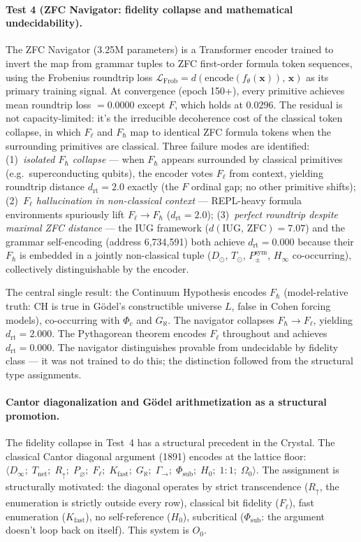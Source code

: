 \documentclass[12pt,a4paper]{article}
\newcommand{\Phic}{\Phi_c}
\newcommand{\Ppms}{P_{\pm}^{\text{sym}}}
\newcommand{\GamSeq}{\Gamma_{\to}}
\begin{document}
\paragraph{Test 4 (ZFC Navigator: fidelity collapse and mathematical
undecidability).}
\label{par:zfc_nav}
The ZFC Navigator (3.25M parameters) is a Transformer encoder trained
to invert the map from grammar tuples to ZFC first-order formula
token sequences, using the Frobenius roundtrip loss
$\mathcal{L}_\text{Frob} = d(\text{encode}(f_\theta(\mathbf{x})),\,\mathbf{x})$
as its primary training signal. At convergence (epoch 150+), every
primitive achieves mean roundtrip loss $= 0.0000$ except $F$, which
holds at $0.0296$. The residual is not capacity-limited: it's the
irreducible decoherence cost of the classical token collapse, in which
$F_\ell$ and $F_\hbar$ map to identical ZFC formula tokens when the
surrounding primitives are classical. Three failure modes are
identified: (1)~\emph{isolated $F_\hbar$ collapse} --- when $F_\hbar$
appears surrounded by classical primitives (e.g.\ superconducting
qubits), the encoder votes $F_\ell$ from context, yielding roundtrip
distance $d_\text{rt} = 2.0$ exactly (the $F$ ordinal gap; no other
primitive shifts); (2)~\emph{$F_\ell$ hallucination in non-classical
context} --- REPL-heavy formula environments spuriously lift
$F_\ell \to F_\hbar$ ($d_\text{rt} = 2.0$); (3)~\emph{perfect
roundtrip despite maximal ZFC distance} --- the IUG framework
($d(\text{IUG},\,\text{ZFC}) = 7.07$) and the grammar self-encoding
(address 6,734,591) both achieve $d_\text{rt} = 0.000$ because their
$F_\hbar$ is embedded in a jointly non-classical tuple ($D_\odot$,
$T_\odot$, $\Ppms$, $H_\infty$ co-occurring), collectively
distinguishable by the encoder.

The central single result: the Continuum Hypothesis encodes $F_\hbar$
(model-relative truth: CH is true in G\"{o}del's constructible
universe $L$, false in Cohen forcing models), co-occurring with
$\Phic$ and $G_\aleph$. The navigator collapses $F_\hbar \to F_\ell$,
yielding $d_\text{rt} = 2.000$. The Pythagorean theorem encodes
$F_\ell$ throughout and achieves $d_\text{rt} = 0.000$. The navigator
distinguishes provable from undecidable by fidelity class --- it was
not trained to do this; the distinction followed from the structural
type assignments.

\paragraph{Cantor diagonalization and G\"{o}del arithmetization as a structural promotion.}
\label{par:cantor_godel}
The fidelity collapse in Test~4 has a structural precedent in the Crystal.
The classical Cantor diagonal argument (1891) encodes at the lattice floor:
$\langle D_\infty;\; T_\text{net};\; R_\uparrow;\; P_\varnothing;\; F_\ell;\;
K_\text{fast};\; G_\aleph;\; \GamSeq;\; \Phi_\text{sub};\; H_0;\; 1{:}1;\; \Omega_0 \rangle$.
The assignment is structurally motivated: the diagonal operates by strict
transcendence ($R_\uparrow$, the enumeration is strictly outside every row),
classical bit fidelity ($F_\ell$), fast enumeration ($K_\text{fast}$), no self-reference
($H_0$), subcritical ($\Phi_\text{sub}$: the argument doesn't loop back on itself).
This system is $O_0$.
\end{document}
